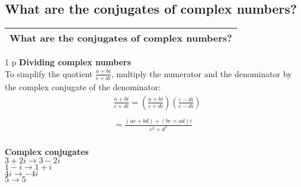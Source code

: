 \subsection{What are the conjugates of complex numbers?}
\begin{small}
    \begin{tabularx}{1\textwidth}{
            p{}
        }
        \toprule
            What are the conjugates of complex numbers?
        \\
        \bottomrule
    \end{tabularx}
\end{small}
\begin{small}
    \begin{tabularx}{1\textwidth}{
            p{}
        }
        \toprule
        \textbf{Dividing complex numbers} \\
        To simplify the quotient $ \frac{a + bi}{c + di}$, multiply the
        numerator and the denominator by the complex conjugate of the
        denominator: \\
        \[
            \begin{aligned}
                &\frac{a + bi}{c + di} = \left(\frac{a + bi}{c +
                    di}\right)\left(\frac{c - di}{c -di}\right) \\
                    \\
                &=\frac{\left(ac + bd\right) + \left(bc=ad\right)i}{c^2 + d^2}
            \end{aligned}
        \]
        \\
        \midrule
        \textbf{Complex conjugates} \\
        $3 + 2i \rightarrow 3 - 2i$ \\
        $1 - i \rightarrow 1 + i$ \\
        $4i \rightarrow -4i$ \\
        $5 \rightarrow 5$
        \\
        \bottomrule


    \end{tabularx}
\end{small}
